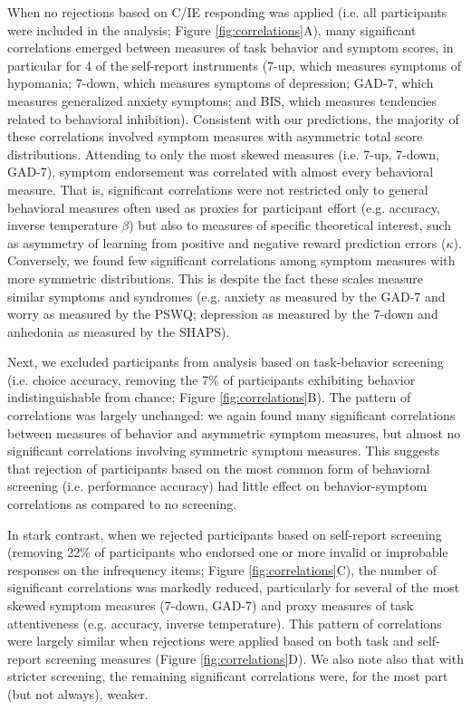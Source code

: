 \documentclass[a4paper,notitlepage,12pt]{article}
\begin{document}
When no rejections based on C/IE responding was applied (i.e. all participants were included in the analysis; Figure \ref{fig:correlations}A), many significant correlations emerged between measures of task behavior and symptom scores, in particular for 4 of the self-report instruments (7-up, which measures symptoms of hypomania; 7-down, which measures symptoms of depression; GAD-7, which measures generalized anxiety symptoms; and BIS, which measures tendencies related to behavioral inhibition). Consistent with our predictions, the majority of these correlations involved symptom measures with asymmetric total score distributions. Attending to only the most skewed measures (i.e. 7-up, 7-down, GAD-7), symptom endorsement was correlated with almost every behavioral measure. That is, significant correlations were not restricted only to general behavioral measures often used as proxies for participant effort (e.g. accuracy, inverse temperature $\beta$) but also to measures of specific theoretical interest, such as asymmetry of learning from positive and negative reward prediction errors ($\kappa$). Conversely, we found few significant correlations among symptom measures with more symmetric distributions. This is despite the fact these scales measure similar symptoms and syndromes (e.g. anxiety as measured by the GAD-7 and worry as measured by the PSWQ; depression as measured by the 7-down and anhedonia as measured by the SHAPS). 

Next, we excluded participants from analysis based on task-behavior screening (i.e. choice accuracy, removing the 7\% of participants exhibiting behavior indistinguishable from chance; Figure \ref{fig:correlations}B). The pattern of correlations was largely unchanged: we again found many significant correlations between measures of behavior and asymmetric symptom measures, but almost no significant correlations involving symmetric symptom measures. This suggests that rejection of participants based on the most common form of behavioral screening (i.e. performance accuracy) had little effect on behavior-symptom correlations as compared to no screening.  

In stark contrast, when we rejected participants based on self-report screening  (removing 22\% of participants who endorsed one or more invalid or improbable responses on the infrequency items; Figure \ref{fig:correlations}C), the number of significant correlations was markedly reduced, particularly for several of the most skewed symptom measures (7-down, GAD-7) and proxy measures of task attentiveness (e.g. accuracy, inverse temperature). This pattern of correlations were largely similar when rejections were applied based on both task and self-report screening measures (Figure \ref{fig:correlations}D). We also note also that with stricter screening, the remaining significant correlations were, for the most part (but not always), weaker. 
\end{document}
